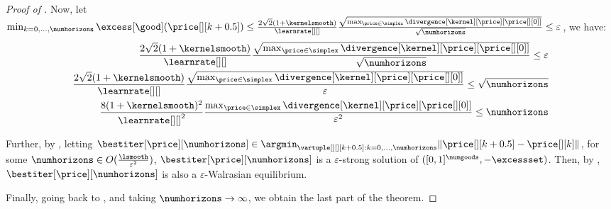 \begin{proof}[Proof of ]
    Now, let $\min_{k = 0, \hdots, \numhorizons}  \excess[\good](\price[][k+0.5]) \leq \frac{2 \sqrt{2} (1 + \kernelsmooth)}{\learnrate[ ][ ]} \frac{\sqrt{\max_{\price \in \simplex}\divergence[\kernel][{\price}][{\price[][0]}]}}{\sqrt{\numhorizons}} \leq \varepsilon$, we have: 
    \begin{align*}
        \frac{2 \sqrt{2}(1 + \kernelsmooth)}{\learnrate[ ][ ]} \frac{\sqrt{\max_{\price \in \simplex}\divergence[\kernel][{\price}][{\price[][0]}]}}{\sqrt{\numhorizons}} \leq \varepsilon\\
        \frac{2 \sqrt{2}(1 + \kernelsmooth)}{\learnrate[ ][ ]} \frac{\sqrt{\max_{\price \in \simplex}\divergence[\kernel][{\price}][{\price[][0]}]}}{\varepsilon} \leq \sqrt{\numhorizons}\\
        \frac{8(1 + \kernelsmooth)^2}{\learnrate[ ][ ]^2} \frac{\max_{\price \in \simplex}\divergence[\kernel][{\price}][{\price[][0]}]}{\varepsilon^2} \leq \numhorizons
    \end{align*}

    Further, by , letting $\bestiter[{\price}][\numhorizons] \in \argmin_{\vartuple[][][k+0.5] : k = 0, \hdots, \numhorizons} \|\price[][k+0.5] - \price[][k]\|$, for some $\numhorizons \in O(\frac{\lsmooth}{\varepsilon^2})$, 
    $\bestiter[{\price}][\numhorizons]$ is a $\varepsilon$-strong solution of $([0, 1]^\numgoods, -\excessset)$. Then, by , $\bestiter[{\price}][\numhorizons]$ is also a $\varepsilon$-Walrasian equilibrium.
    
    Finally, going back to , and taking $\numhorizons \to \infty$, we obtain the last part of the theorem.
    \fi
\end{proof}


